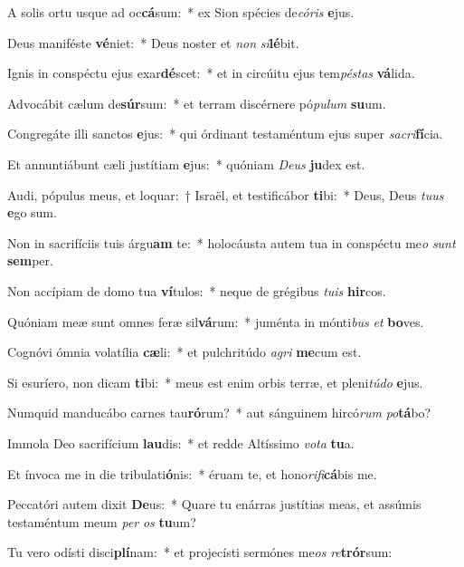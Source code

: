 \item A solis ortu usque ad oc\textbf{cá}sum:~* ex Sion spécies de\textit{có}\textit{ris} \textbf{e}jus.
\item Deus maniféste \textbf{vé}niet:~* Deus noster et \textit{non} \textit{si}\textbf{lé}bit.
\item Ignis in conspéctu ejus exar\textbf{dé}scet:~* et in circúitu ejus tem\textit{pés}\textit{tas} \textbf{vá}lida.
\item Advocábit cælum de\textbf{súr}sum:~* et terram discérnere pó\textit{pu}\textit{lum} \textbf{su}um.
\item Congregáte illi sanctos \textbf{e}jus:~* qui órdinant testaméntum ejus super \textit{sa}\textit{cri}\textbf{fí}cia.
\item Et annuntiábunt cæli justítiam \textbf{e}jus:~* quóniam \textit{De}\textit{us} \textbf{ju}dex est.
\item Audi, pópulus meus, et loquar:~† Israël, et testificábor \textbf{ti}bi:~* Deus, Deus \textit{tu}\textit{us} \textbf{e}go sum.
\item Non in sacrifíciis tuis árgu\textbf{am} te:~* holocáusta autem tua in conspéctu me\textit{o} \textit{sunt} \textbf{sem}per.
\item Non accípiam de domo tua \textbf{ví}tulos:~* neque de grégibus \textit{tu}\textit{is} \textbf{hir}cos.
\item Quóniam meæ sunt omnes feræ sil\textbf{vá}rum:~* juménta in mónti\textit{bus} \textit{et} \textbf{bo}ves.
\item Cognóvi ómnia volatília \textbf{cæ}li:~* et pulchritúdo \textit{a}\textit{gri} \textbf{me}cum est.
\item Si esuríero, non dicam \textbf{ti}bi:~* meus est enim orbis terræ, et pleni\textit{tú}\textit{do} \textbf{e}jus.
\item Numquid manducábo carnes tau\textbf{ró}rum?~* aut sánguinem hircó\textit{rum} \textit{po}\textbf{tá}bo?
\item Immola Deo sacrifícium \textbf{lau}dis:~* et redde Altíssimo \textit{vo}\textit{ta} \textbf{tu}a.
\item Et ínvoca me in die tribulati\textbf{ó}nis:~* éruam te, et hono\textit{ri}\textit{fi}\textbf{cá}bis me.
\item Peccatóri autem dixit \textbf{De}us:~* Quare tu enárras justítias meas, et assúmis testaméntum meum \textit{per} \textit{os} \textbf{tu}um?
\item Tu vero odísti disci\textbf{plí}nam:~* et projecísti sermónes me\textit{os} \textit{re}\textbf{trór}sum:
